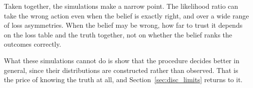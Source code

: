 Taken together, the simulations make a narrow point. The likelihood ratio can
take the wrong action even when the belief is exactly right, and over a wide
range of loss asymmetries. When the belief may be wrong, how far to trust it
depends on the loss table and the truth together, not on whether the belief
ranks the outcomes correctly.

What these simulations cannot do is show that the procedure decides better in
general, since their distributions are constructed rather than observed. That
is the price of knowing the truth at all, and Section~\ref{sec:disc_limits}
returns to it.
